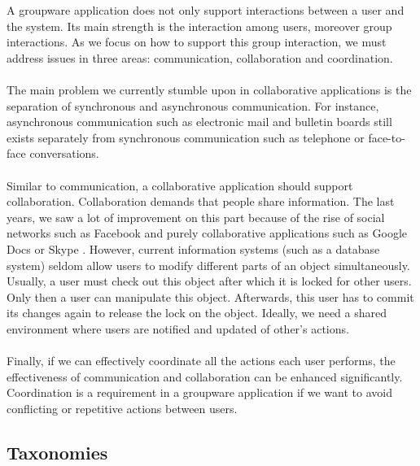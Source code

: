 A groupware application does not only support interactions between a user and the system. Its main strength is the interaction among users, moreover group interactions. As we focus on how to support this group interaction, we must address issues in three areas: communication, collaboration and coordination.
\\ \\
The main problem we currently stumble upon in collaborative applications is the separation of synchronous and asynchronous communication. For instance, asynchronous communication such as electronic mail and bulletin boards still exists separately from synchronous communication such as telephone or face-to-face conversations. 
\\ \\
Similar to communication, a collaborative application should support collaboration. Collaboration demands that people share information. The last years, we saw a lot of improvement on this part because of the rise of social networks such as Facebook \cite{Facebook} and purely collaborative applications such as Google Docs \cite{GDocs} or Skype \cite{Skype}. However, current information systems (such as a database system) seldom allow users to modify different parts of an object simultaneously. Usually, a user must check out this object after which it is locked for other users. Only then a user can manipulate this object. Afterwards, this user has to commit its changes again to release the lock on the object. Ideally, we need a shared environment where users are notified and updated of other's actions. 
\\ \\
Finally, if we can effectively coordinate all the actions each user performs, the effectiveness of communication and collaboration can be enhanced significantly. Coordination is a requirement in a groupware application if we want to avoid conflicting or repetitive actions between users.

\subsection{Taxonomies}

